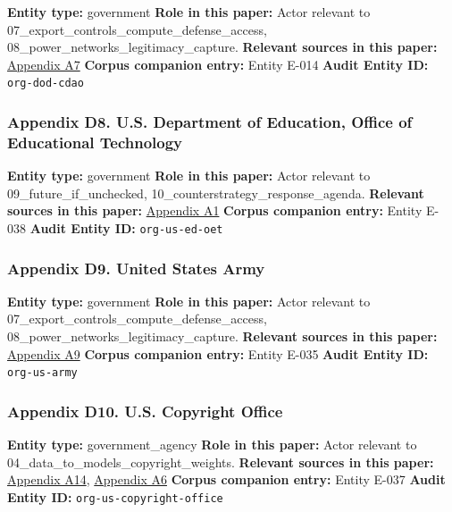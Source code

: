 \documentclass[
  american,
  11pt,
  letterpaper,
]{article}
\begin{document}
\textbf{Entity type:} government \textbf{Role in this paper:} Actor
relevant to 07\_export\_controls\_compute\_defense\_access,
08\_power\_networks\_legitimacy\_capture. \textbf{Relevant sources in
this paper:}
\hyperref[ch-10-appendix-a7-introducing-openai-for-government]{Appendix
A7} \textbf{Corpus companion entry:} Entity E-014 \textbf{Audit Entity
ID:} \texttt{org-dod-cdao}

\subsubsection{Appendix D8. U.S. Department of Education, Office of
Educational
Technology}\label{ch-10-appendix-d8-u-s-department-of-education-office-of-educational-technology}

\textbf{Entity type:} government \textbf{Role in this paper:} Actor
relevant to 09\_future\_if\_unchecked,
10\_counterstrategy\_response\_agenda. \textbf{Relevant sources in this
paper:}
\hyperref[ch-10-appendix-a1-artificial-intelligence-and-the-future-of-teaching-and-learning-insights-and-recommendations]{Appendix
A1} \textbf{Corpus companion entry:} Entity E-038 \textbf{Audit Entity
ID:} \texttt{org-us-ed-oet}

\subsubsection{Appendix D9. United States
Army}\label{ch-10-appendix-d9-united-states-army}

\textbf{Entity type:} government \textbf{Role in this paper:} Actor
relevant to 07\_export\_controls\_compute\_defense\_access,
08\_power\_networks\_legitimacy\_capture. \textbf{Relevant sources in
this paper:}
\hyperref[ch-10-appendix-a9-army-launches-detachment-201-executive-innovation-corps-to-drive-tech-transformation]{Appendix
A9} \textbf{Corpus companion entry:} Entity E-035 \textbf{Audit Entity
ID:} \texttt{org-us-army}

\subsubsection{Appendix D10. U.S. Copyright
Office}\label{ch-10-appendix-d10-u-s-copyright-office}

\textbf{Entity type:} government\_agency \textbf{Role in this paper:}
Actor relevant to 04\_data\_to\_models\_copyright\_weights.
\textbf{Relevant sources in this paper:}
\hyperref[ch-10-appendix-a14-copyright-and-artificial-intelligence-notice-of-inquiry]{Appendix
A14},
\hyperref[ch-10-appendix-a6-copyright-and-artificial-intelligence-part-3-generative-ai-training-pre-publication-version]{Appendix
A6} \textbf{Corpus companion entry:} Entity E-037 \textbf{Audit Entity
ID:} \texttt{org-us-copyright-office}
\end{document}
